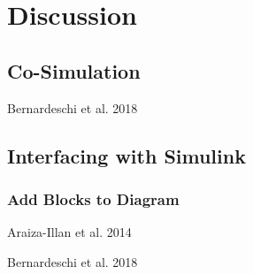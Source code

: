 \section{Discussion}

\subsection{Co-Simulation}

Bernardeschi et al. 2018~\cite{bernardeschi_pvs-simulink_2018}

\subsection{Interfacing with Simulink}

\subsubsection{Add Blocks to Diagram}

Araiza-Illan et al. 2014~\cite{araiza-illan_formal_2014}

Bernardeschi et al. 2018~\cite{bernardeschi_pvs-simulink_2018}